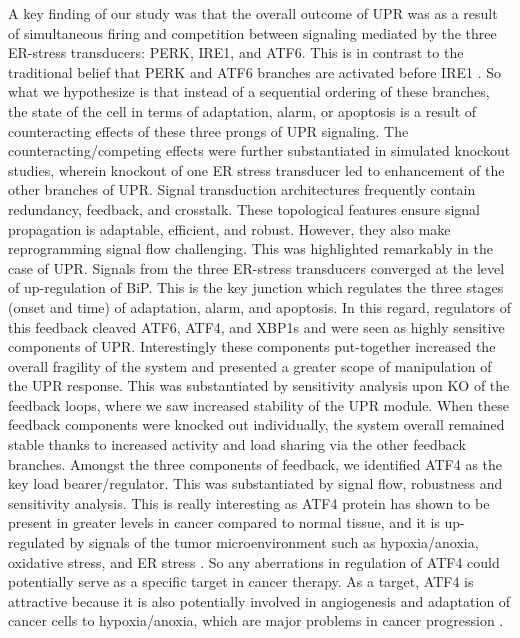 \documentclass[fleqn,10pt]{wlscirep}
\begin{document}
A key finding of our study was that the overall outcome of UPR was as a result of simultaneous firing and competition between signaling mediated by the three ER-stress transducers: PERK, IRE1, and ATF6. This is in contrast to the traditional belief that PERK and ATF6 branches are activated before IRE1 \cite{szegezdi2006mediators}. So what we hypothesize is that instead of a sequential ordering of these branches, the state of the cell in terms of adaptation, alarm, or apoptosis is a result of counteracting effects of these three prongs of UPR signaling. The counteracting/competing effects were further substantiated in simulated knockout studies, wherein knockout of one ER stress transducer led to enhancement of the other branches of UPR. Signal transduction architectures frequently contain redundancy, feedback, and crosstalk. These topological features ensure signal propagation is adaptable, efficient, and robust. However, they also make reprogramming signal flow challenging. This was highlighted remarkably in the case of UPR. Signals from the three ER-stress transducers converged at the level of up-regulation of BiP. This is the key junction which regulates the three stages (onset and time) of adaptation, alarm, and apoptosis. In this regard, regulators of this feedback cleaved ATF6, ATF4, and XBP1s and were seen as highly sensitive components of UPR. Interestingly these components put-together increased the overall fragility of the system and presented a greater scope of manipulation of the UPR response. This was substantiated by sensitivity analysis upon KO of the feedback loops, where we saw increased stability of the UPR module. When these feedback components were knocked out individually, the system overall remained stable thanks to increased activity and load sharing via the other feedback branches. Amongst the three components of feedback, we identified ATF4 as the key load bearer/regulator. This was substantiated by signal flow, robustness and sensitivity analysis. This is really interesting as ATF4 protein has shown to be present in greater levels in cancer compared to normal tissue, and it is up-regulated by signals of the tumor microenvironment such as hypoxia/anoxia, oxidative stress, and ER stress \cite{Ameri:2008fk}. So any aberrations in regulation of ATF4 could potentially serve as a specific target in cancer therapy. As a target, ATF4 is attractive because it is also potentially involved in angiogenesis and adaptation of cancer cells to hypoxia/anoxia, which are major problems in cancer progression \cite{Ameri:2008fk}.
\end{document}

